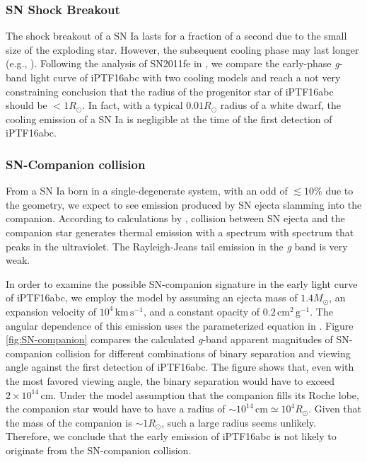 \documentclass[twocolumn]{aastex61}
\newcommand{\sm}{M_\odot}
\newcommand{\sr}{R_\odot}
\begin{document}
\subsubsection{SN Shock Breakout}

The shock breakout of a SN Ia lasts for a fraction of a second due to
the small size of the exploding star. However, the subsequent cooling
phase may last longer (e.g., \citealt{2010ApJ...708..598P}).
Following the analysis of SN2011fe in \citet{2012ApJ...744L..17B}, we
compare the early-phase \textit{g}-band light curve of iPTF16abc with
two cooling models \citep{2011ApJ...728...63R, 2010ApJ...708..598P}
and reach a not very constraining conclusion that the radius of the
progenitor star of iPTF16abc should be $<1\sr$. In fact, with a
typical $0.01\sr$ radius of a white dwarf, the cooling emission of a
SN Ia is negligible at the time of the first detection of iPTF16abc.

\subsubsection{SN-Companion collision}

From a SN Ia born in a single-degenerate system, with an odd of
$\lesssim10\%$ due to the geometry, we expect to see emission produced
by SN ejecta slamming into the companion. According to calculations by
\citet{2010ApJ...708.1025K}, collision between SN ejecta and the
companion star generates thermal emission with a spectrum with
spectrum that peaks in the ultraviolet. The Rayleigh-Jeans tail
emission in the \textit{g} band is very weak.

In order to examine the possible SN-companion signature in the early
light curve of iPTF16abc, we employ the \citet{2010ApJ...708.1025K}
model by assuming an ejecta mass of $1.4\sm$, an expansion velocity of
$10^{4}\,\textrm{km}\,\textrm{s}^{-1}$, and a constant opacity of
$0.2\,\textrm{cm}^2\,\textrm{g}^{-1}$. The angular dependence of this
emission uses the parameterized equation in
\citet{2012ApJ...749...18B}.  Figure \ref{fig:SN-companion} compares
the calculated \textit{g}-band apparent magnitudes of SN-companion
collision for different combinations of binary separation and viewing
angle against the first detection of iPTF16abc. The figure shows that,
even with the most favored viewing angle, the binary separation would
have to exceed $2\times10^{14}\,\textrm{cm}$. Under the model assumption that the
companion fills its Roche lobe, the companion star would have to have
a radius of $\sim10^{14}\,\textrm{cm}\simeq10^{4}\sr$. Given that the
mass of the companion is $\sim1\sr$, such a large radius seems unlikely.
Therefore, we conclude that the early emission of iPTF16abc is not likely
to originate from the SN-companion collision. 
\end{document}
